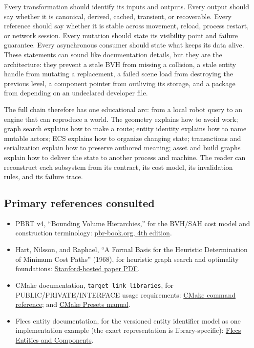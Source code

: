 Every transformation should identify its inputs and outputs. Every output should say whether it is canonical, derived, cached, transient, or recoverable. Every reference should say whether it is stable across movement, reload, process restart, or network session. Every mutation should state its visibility point and failure guarantee. Every asynchronous consumer should state what keeps its data alive. These statements can sound like documentation details, but they are the architecture: they prevent a stale BVH from missing a collision, a stale entity handle from mutating a replacement, a failed scene load from destroying the previous level, a component pointer from outliving its storage, and a package from depending on an undeclared developer file.

The full chain therefore has one educational arc: from a local robot query to an engine that can reproduce a world. The geometry explains how to avoid work; graph search explains how to make a route; entity identity explains how to name mutable actors; ECS explains how to organize changing state; transactions and serialization explain how to preserve authored meaning; asset and build graphs explain how to deliver the state to another process and machine. The reader can reconstruct each subsystem from its contract, its cost model, its invalidation rules, and its failure trace.

\subsection{Primary references consulted}\label{05-engine-i-ch008-primary-references-consulted}

\begin{itemize}
\tightlist
\item
  PBRT v4, ``Bounding Volume Hierarchies,'' for the BVH/SAH cost model and construction terminology: \href{https://www.pbr-book.org/4ed/Primitives_and_Intersection_Acceleration/Bounding_Volume_Hierarchies}{pbr-book.org, 4th edition}.
\item
  Hart, Nilsson, and Raphael, ``A Formal Basis for the Heuristic Determination of Minimum Cost Paths'' (1968), for heuristic graph search and optimality foundations: \href{https://ai.stanford.edu/~nilsson/OnlinePubs-Nils/PublishedPapers/astar.pdf}{Stanford-hosted paper PDF}.
\item
  CMake documentation, \texttt{target\_link\_libraries}, for PUBLIC/PRIVATE/INTERFACE usage requirements: \href{https://cmake.org/cmake/help/latest/command/target_link_libraries.html}{CMake command reference}; and \href{https://cmake.org/cmake/help/latest/manual/cmake-presets.7.html}{CMake Presets manual}.
\item
  Flecs entity documentation, for the versioned entity identifier model as one implementation example (the exact representation is library-specific): \href{https://www.flecs.dev/flecs/EntitiesComponents.html}{Flecs Entities and Components}.
\end{itemize}


